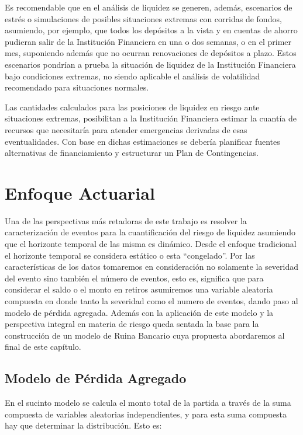 \documentclass[]{article}
\begin{document}
Es recomendable que en el análisis de liquidez se generen, además,
escenarios de estrés o simulaciones de posibles situaciones extremas con
corridas de fondos, asumiendo, por ejemplo, que todos los depósitos a la
vista y en cuentas de ahorro pudieran salir de la Institución Financiera
en una o dos semanas, o en el primer mes, suponiendo además que no
ocurran renovaciones de depósitos a plazo. Estos escenarios pondrían a
prueba la situación de liquidez de la Institución Financiera bajo
condiciones extremas, no siendo aplicable el análisis de volatilidad
recomendado para situaciones normales.

Las cantidades calculados para las posiciones de liquidez en riesgo ante
situaciones extremas, posibilitan a la Institución Financiera estimar la
cuantía de recursos que necesitaría para atender emergencias derivadas
de esas eventualidades. Con base en dichas estimaciones se debería
planificar fuentes alternativas de financiamiento y estructurar un Plan
de Contingencias.

\hypertarget{enfoque-actuarial}{%
\section{Enfoque Actuarial}\label{enfoque-actuarial}}

Una de las perspectivas más retadoras de este trabajo es resolver la
caracterización de eventos para la cuantificación del riesgo de liquidez
asumiendo que el horizonte temporal de las misma es dinámico. Desde el
enfoque tradicional el horizonte temporal se considera estático o esta
``congelado''. Por las características de los datos tomaremos en
consideración no solamente la severidad del evento sino también el
número de eventos, esto es, significa que para considerar el saldo o el
monto en retiros asumiremos una variable aleatoria compuesta en donde
tanto la severidad como el numero de eventos, dando paso al modelo de
pérdida agregada. Además con la aplicación de este modelo y la
perspectiva integral en materia de riesgo queda sentada la base para la
construcción de un modelo de Ruina Bancario cuya propuesta abordaremos
al final de este capítulo.

\hypertarget{modelo-de-perdida-agregado}{%
\subsection{Modelo de Pérdida
Agregado}\label{modelo-de-perdida-agregado}}

En el sucinto modelo se calcula el monto total de la partida a través de
la suma compuesta de variables aleatorias independientes, y para esta
suma compuesta hay que determinar la distribución. Esto es:
\end{document}
